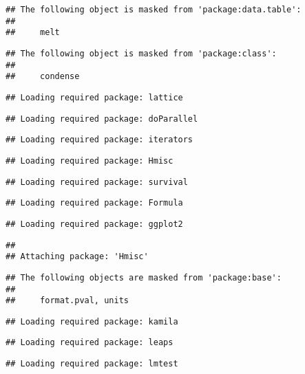 \documentclass[11pt,]{article}
\begin{document}
\begin{verbatim}
## The following object is masked from 'package:data.table':
## 
##     melt
\end{verbatim}

\begin{verbatim}
## The following object is masked from 'package:class':
## 
##     condense
\end{verbatim}

\begin{verbatim}
## Loading required package: lattice
\end{verbatim}

\begin{verbatim}
## Loading required package: doParallel
\end{verbatim}

\begin{verbatim}
## Loading required package: iterators
\end{verbatim}

\begin{verbatim}
## Loading required package: Hmisc
\end{verbatim}

\begin{verbatim}
## Loading required package: survival
\end{verbatim}

\begin{verbatim}
## Loading required package: Formula
\end{verbatim}

\begin{verbatim}
## Loading required package: ggplot2
\end{verbatim}

\begin{verbatim}
## 
## Attaching package: 'Hmisc'
\end{verbatim}

\begin{verbatim}
## The following objects are masked from 'package:base':
## 
##     format.pval, units
\end{verbatim}

\begin{verbatim}
## Loading required package: kamila
\end{verbatim}

\begin{verbatim}
## Loading required package: leaps
\end{verbatim}

\begin{verbatim}
## Loading required package: lmtest
\end{verbatim}
\end{document}
